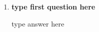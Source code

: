 \documentclass[12pt]{article}
\begin{document}


\begin{enumerate}
    \item\textbf{type first question here}

    type answer here

\end{enumerate}


\end{document}
